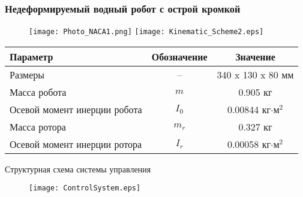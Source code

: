 \begin{frame}
\frametitle{Недеформируемый водный робот с острой кромкой}

\begin{figure}[!ht]
	\centering
	\texttt{[image: Photo\_NACA1.png]} \hspace{10mm} \texttt{[image: Kinematic\_Scheme2.eps]}
\end{figure}

\begin{table}[h]
	\centering
	\begin{tabular}{|l|c|c|}
		\hline
		Параметр & Обозначение & Значение \\ \hline
		Размеры & -- & 340 x 130 x 80 мм \\
		Масса робота & $m$ & 0.905 кг \\
		Осевой момент инерции робота & $I_0$ & 0.00844 кг$\cdot$м$^2$ \\
		Масса ротора & $m_r$ &  0.327 кг \\
		Осевой момент инерции ротора & $I_r$ & 0.00058 кг$\cdot$м$^2$ \\
		\hline
	\end{tabular}
	\label{tab1}
\end{table}

Структурная схема системы управления

\vspace{-1mm}
\begin{figure}[!h]
	\centering
	\texttt{[image: ControlSystem.eps]}
\end{figure}

\end{frame}


%
%

